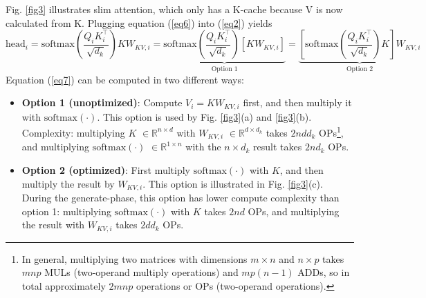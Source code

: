 \documentclass{article}
\newcommand{\eR}[2]{$\in \mathbb{R}^{#1 \times #2}$} %
\begin{document}
Fig. \ref{fig3} illustrates slim attention, which only has a K-cache because V is now calculated from K. Plugging equation (\ref{eq6}) into (\ref{eq2}) yields
\begin{equation}
  \text{head}_i = \text{softmax} \left( \frac{Q_i K_i^\top}{\sqrt{d_k}} \right) K W_{KV,i}
  = \underbrace{ \text{softmax} \left( \frac{Q_i K_i^\top}{\sqrt{d_k}} \right) \left[ K W_{KV,i} \right] }_{\text{Option 1}}
  = \underbrace{ \left[ \text{softmax} \left( \frac{Q_i K_i^\top}{\sqrt{d_k}} \right) K \right] W_{KV,i} }_{\text{Option 2}}
\label{eq7} \end{equation}
Equation (\ref{eq7}) can be computed in two different ways:
\begin{itemize}[topsep=-1pt, itemsep=-1pt]
  \item \textbf{Option 1 (unoptimized)}: Compute $V_i = K W_{KV,i}$ first, and then multiply it with $\text{softmax}(\cdot)$. This option is used by Fig. \ref{fig3}(a) and \ref{fig3}(b). Complexity: multiplying $K$ \eR{n}{d} with $W_{KV,i}$ \eR{d}{d_k} takes $2 n d d_k$ OPs\footnote{In general, multiplying two matrices with dimensions $m \times n$ and $n \times p$ takes $mnp$ MULs (two-operand multiply operations) and $mp(n-1)$ ADDs, so in total approximately $2mnp$ operations or OPs (two-operand operations).}, and multiplying $\text{softmax}(\cdot)$ \eR{1}{n} with the $n \times d_k$ result takes $2 n d_k$ OPs.
  \item \textbf{Option 2 (optimized)}: First multiply $\text{softmax}(\cdot)$ with $K$, and then multiply the result by $W_{KV,i}$.  This option is illustrated in Fig. \ref{fig3}(c). During the generate-phase, this option has lower compute complexity than option 1: multiplying $\text{softmax}(\cdot)$ with $K$ takes $2nd$ OPs, and multiplying the result with $W_{KV,i}$ takes $2dd_k$ OPs.
\end{itemize}
\end{document}
